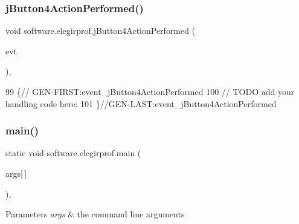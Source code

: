 \subsubsection{\texorpdfstring{j\+Button4\+Action\+Performed()}{jButton4ActionPerformed()}}
{\footnotesize\ttfamily void software.\+elegirprof.\+j\+Button4\+Action\+Performed (\begin{DoxyParamCaption}\item[{java.\+awt.\+event.\+Action\+Event}]{evt }\end{DoxyParamCaption})\hspace{0.3cm}{\ttfamily [inline]}, {\ttfamily [private]}}


\begin{DoxyCode}
99                                                                          \{\textcolor{comment}{//
      GEN-FIRST:event\_jButton4ActionPerformed}
100         \textcolor{comment}{// TODO add your handling code here:}
101     \}\textcolor{comment}{//GEN-LAST:event\_jButton4ActionPerformed}
\end{DoxyCode}
\mbox{\label{classsoftware_1_1elegirprof_a416eea3c7c1afd90202409d2fd720735}} 
\subsubsection{\texorpdfstring{main()}{main()}}
{\footnotesize\ttfamily static void software.\+elegirprof.\+main (\begin{DoxyParamCaption}\item[{String}]{args\mbox{[}$\,$\mbox{]} }\end{DoxyParamCaption})\hspace{0.3cm}{\ttfamily [inline]}, {\ttfamily [static]}}


\begin{DoxyParams}{Parameters}
{\em args} & the command line arguments \\
\hline
\end{DoxyParams}

